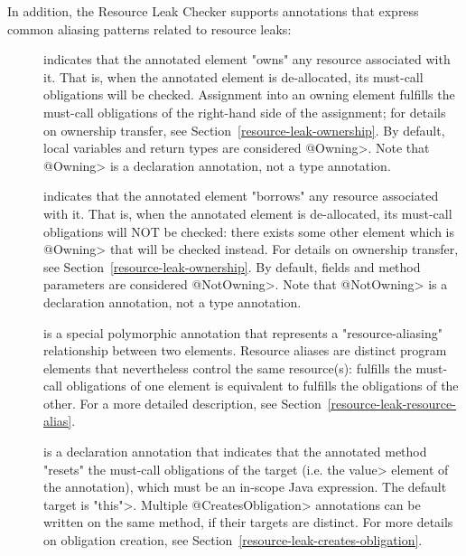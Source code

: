 In addition, the Resource Leak Checker supports annotations that express common
aliasing patterns related to resource leaks:

\begin{description}

\item[]
  indicates that the annotated element "owns" any resource associated with
  it. That is, when the annotated element is de-allocated, its must-call
  obligations will be checked. Assignment into an owning element fulfills
  the must-call obligations of the right-hand side of the assignment; for
  details on ownership transfer, see Section~\ref{resource-leak-ownership}.
  By default, local variables and return types are considered \<@Owning>.
  Note that \<@Owning> is a declaration annotation, not a type annotation.

\item[]
  indicates that the annotated element "borrows" any resource associated with
  it. That is, when the annotated element is de-allocated, its must-call
  obligations will NOT be checked: there exists some other element which is
  \<@Owning> that will be checked instead. For
  details on ownership transfer, see Section~\ref{resource-leak-ownership}.
  By default, fields and method parameters are considered \<@NotOwning>.
  Note that \<@NotOwning> is a declaration annotation, not a type annotation.

\item[]
  is a special polymorphic annotation that represents a "resource-aliasing"
  relationship between two elements. Resource aliases are distinct program elements
  that nevertheless control the same resource(s): fulfills the must-call obligations
  of one element is equivalent to fulfills the obligations of the other.
  For a more detailed description, see
  Section~\ref{resource-leak-resource-alias}.

\item[]
  is a declaration annotation that indicates that the annotated method "resets" the must-call
  obligations of the target (i.e. the \<value> element of the annotation), which must
  be an in-scope Java expression. The default target is \<"this">. Multiple \<@CreatesObligation>
  annotations can be written on the same method, if their targets are distinct. For more details
  on obligation creation, see Section~\ref{resource-leak-creates-obligation}.

\end{description}

